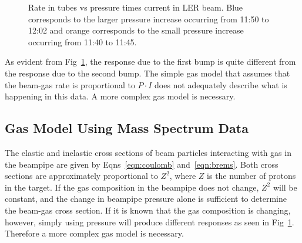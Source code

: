 \begin{figure}
	\centering
	\caption[Rate in \he tubes vs pressure times current in LER beam]{Rate in \he tubes vs pressure times current in LER beam. Blue corresponds to the larger pressure increase occurring from 11:50 to 12:02 and orange corresponds to the small pressure increase occurring from 11:40 to 11:45.}	
	\label{fig:rateVsPressCur}
\end{figure}




	As evident from Fig~\ref{fig:rateVsPressCur}, the response due to the first bump is quite different from the response due to the second bump. The simple gas model that assumes that the beam-gas rate is proportional to $P\cdot I$ does not adequately describe what is happening in this data. A more complex gas model is necessary.



\subsection{Gas Model Using Mass Spectrum Data}
\label{sec:massSpec}


	The elastic and inelastic cross sections of beam particles interacting with gas in the beampipe are given by Eqns~\ref{eqn:coulomb} and~\ref{eqn:brems}. Both cross sections are approximately proportional to $Z^2$, where $Z$ is the number of protons in the target. If the gas composition in the beampipe does not change, $Z^2$ will be constant, and the change in beampipe pressure alone is sufficient to determine the beam-gas cross section. If it is known that the gas composition is changing, however, simply using pressure will produce different responses as seen in Fig~\ref{fig:rateVsPressCur}. Therefore a more complex gas model is necessary.


